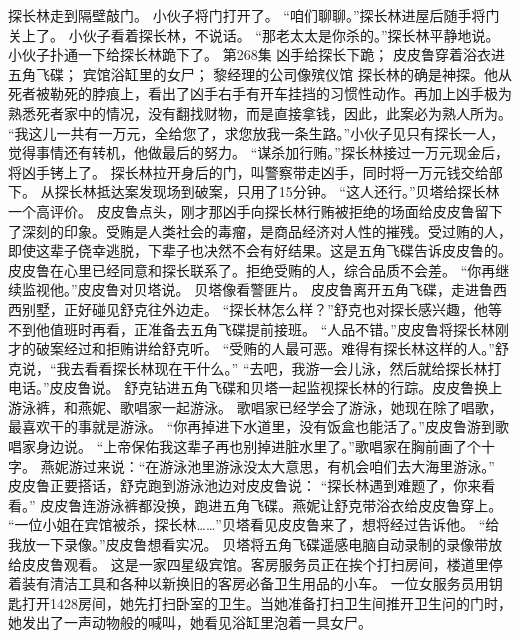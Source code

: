 \documentclass[a4paper,12pt,UTF8,twoside]{ctexbook}
\begin{document}
        探长林走到隔壁敲门。  
        小伙子将门打开了。  
        “咱们聊聊。”探长林进屋后随手将门关上了。  
        小伙子看着探长林，不说话。  
        “那老太太是你杀的。”探长林平静地说。  
        小伙子扑通一下给探长林跪下了。          第268集  
        凶手给探长下跪；  
        皮皮鲁穿着浴衣进五角飞碟；  
        宾馆浴缸里的女尸；  
        黎经理的公司像殡仪馆    
        探长林的确是神探。他从死者被勒死的脖痕上，看出了凶手右手有开车挂挡的习惯性动作。再加上凶手极为熟悉死者家中的情况，没有翻找财物，而是直接拿钱，因此，此案必为熟人所为。  
        “我这儿一共有一万元，全给您了，求您放我一条生路。”小伙子见只有探长一人，觉得事情还有转机，他做最后的努力。  
        “谋杀加行贿。”探长林接过一万元现金后，将凶手铐上了。  
        探长林拉开身后的门，叫警察带走凶手，同时将一万元钱交给部下。        
        从探长林抵达案发现场到破案，只用了15分钟。  
        “这人还行。”贝塔给探长林一个高评价。  
        皮皮鲁点头，刚才那凶手向探长林行贿被拒绝的场面给皮皮鲁留下了深刻的印象。受贿是人类社会的毒瘤，是商品经济对人性的摧残。受过贿的人，即使这辈子侥幸逃脱，下辈子也决然不会有好结果。这是五角飞碟告诉皮皮鲁的。  
        皮皮鲁在心里已经同意和探长联系了。拒绝受贿的人，综合品质不会差。  
        “你再继续监视他。”皮皮鲁对贝塔说。  
        贝塔像看警匪片。  
        皮皮鲁离开五角飞碟，走进鲁西西别墅，正好碰见舒克往外边走。  
        “探长林怎么样？”舒克也对探长感兴趣，他等不到他值班时再看，正准备去五角飞碟提前接班。  
        “人品不错。”皮皮鲁将探长林刚才的破案经过和拒贿讲给舒克听。  
        “受贿的人最可恶。难得有探长林这样的人。”舒克说，“我去看看探长林现在干什么。”  
        “去吧，我游一会儿泳，然后就给探长林打电话。”皮皮鲁说。  
        舒克钻进五角飞碟和贝塔一起监视探长林的行踪。皮皮鲁换上游泳裤，和燕妮、歌唱家一起游泳。  
        歌唱家已经学会了游泳，她现在除了唱歌，最喜欢干的事就是游泳。  
        “你再掉进下水道里，没有饭盒也能活了。”皮皮鲁游到歌唱家身边说。  
        “上帝保佑我这辈子再也别掉进脏水里了。”歌唱家在胸前画了个十字。  
        燕妮游过来说：“在游泳池里游泳没太大意思，有机会咱们去大海里游泳。”  
        皮皮鲁正要搭话，舒克跑到游泳池边对皮皮鲁说：  
        “探长林遇到难题了，你来看看。”  
        皮皮鲁连游泳裤都没换，跑进五角飞碟。燕妮让舒克带浴衣给皮皮鲁穿上。  
        “一位小姐在宾馆被杀，探长林……”贝塔看见皮皮鲁来了，想将经过告诉他。  
        “给我放一下录像。”皮皮鲁想看实况。  
        贝塔将五角飞碟遥感电脑自动录制的录像带放给皮皮鲁观看。  
        这是一家四星级宾馆。客房服务员正在挨个打扫房间，楼道里停着装有清洁工具和各种以新换旧的客房必备卫生用品的小车。  
        一位女服务员用钥匙打开1428房间，她先打扫卧室的卫生。当她准备打扫卫生间推开卫生问的门时，她发出了一声动物般的喊叫，她看见浴缸里泡着一具女尸。        
\end{document}
